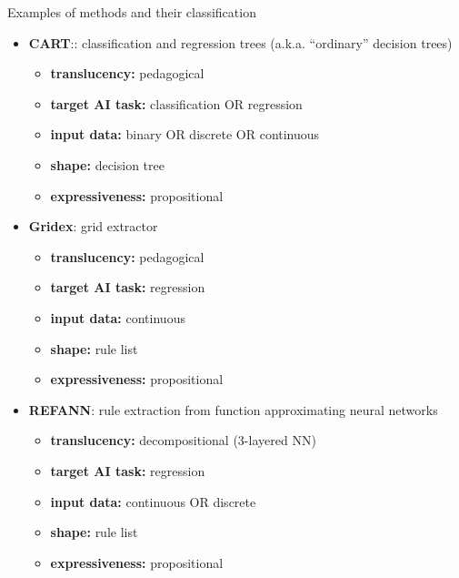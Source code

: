 \documentclass[presentation]{beamer}\mode<presentation>{\usetheme{AMSBolognaFC}}
\begin{document}
\begin{frame}[allowframebreaks]{Examples of methods and their classification}
    \begin{itemize}
        \item \textbf{CART}:: classification and regression trees (a.k.a. ``ordinary'' decision trees)
        \begin{itemize}
            \item \textbf{translucency:} pedagogical
            \item \textbf{target AI task:} classification OR regression
            \item \textbf{input data:} binary OR discrete OR continuous
            \item \textbf{shape:} decision tree
            \item \textbf{expressiveness:} propositional
        \end{itemize}

        \framebreak

        \item \textbf{Gridex}: grid extractor
        \begin{itemize}
            \item \textbf{translucency:} pedagogical
            \item \textbf{target AI task:} regression
            \item \textbf{input data:} continuous
            \item \textbf{shape:} rule list
            \item \textbf{expressiveness:} propositional
        \end{itemize}

        \framebreak

        \item \textbf{REFANN}: rule extraction from function approximating neural networks 
        \begin{itemize}
            \item \textbf{translucency:} decompositional (3-layered NN)
            \item \textbf{target AI task:} regression
            \item \textbf{input data:} continuous OR discrete
            \item \textbf{shape:} rule list
            \item \textbf{expressiveness:} propositional
        \end{itemize}
    \end{itemize}
\end{frame}
\end{document}
